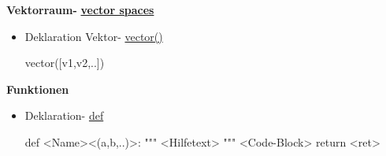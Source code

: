 \documentclass[a4paper,9pt,DIV15,twocolumn]{scrartcl}
\begin{document}
\textbf{Vektorraum- } \href{https://sage.math.uni-goettingen.de/doc/static/reference/sage/categories/vector_spaces.html#vector-spaces}{\textbf{vector spaces}}

\begin{itemize}
 \item Deklaration Vektor- \href{https://sage.math.uni-goettingen.de/doc/static/reference/sage/modules/free_module_element.html#sage.modules.free_module_element.vector}{vector()}
\begin{sagein}
 vector([v1,v2,..]) 
\end{sagein}

\end{itemize}

\textbf{Funktionen}

\begin{itemize}
 \item Deklaration- \href{http://docs.python.org/reference/compound_stmts.html#function-definitions}{def}
\begin{sagein}
def <Name><(a,b,..)>:
    """ <Hilfetext> """
    <Code-Block>
    return <ret>
\end{sagein}
\end{itemize}
\end{document}
